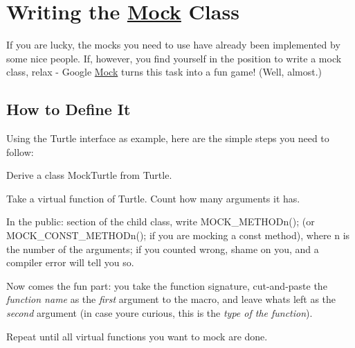 \section*{Writing the \mbox{\hyperlink{class_mock}{Mock}} Class}

If you are lucky, the mocks you need to use have already been implemented by some nice people. If, however, you find yourself in the position to write a mock class, relax -\/ Google \mbox{\hyperlink{class_mock}{Mock}} turns this task into a fun game! (Well, almost.)

\subsection*{How to Define It}

Using the {\ttfamily Turtle} interface as example, here are the simple steps you need to follow\+:


\begin{DoxyEnumerate}
\item Derive a class {\ttfamily Mock\+Turtle} from {\ttfamily Turtle}.
\end{DoxyEnumerate}
\begin{DoxyEnumerate}
\item Take a virtual function of {\ttfamily Turtle}. Count how many arguments it has.
\end{DoxyEnumerate}
\begin{DoxyEnumerate}
\item In the {\ttfamily public\+:} section of the child class, write {\ttfamily M\+O\+C\+K\+\_\+\+M\+E\+T\+H\+O\+Dn();} (or {\ttfamily M\+O\+C\+K\+\_\+\+C\+O\+N\+S\+T\+\_\+\+M\+E\+T\+H\+O\+Dn();} if you are mocking a {\ttfamily const} method), where {\ttfamily n} is the number of the arguments; if you counted wrong, shame on you, and a compiler error will tell you so.
\end{DoxyEnumerate}
\begin{DoxyEnumerate}
\item Now comes the fun part\+: you take the function signature, cut-\/and-\/paste the {\itshape function name} as the {\itshape first} argument to the macro, and leave what\textquotesingle{}s left as the {\itshape second} argument (in case you\textquotesingle{}re curious, this is the {\itshape type of the function}).
\end{DoxyEnumerate}
\begin{DoxyEnumerate}
\item Repeat until all virtual functions you want to mock are done.
\end{DoxyEnumerate}

